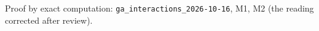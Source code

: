 Proof by exact computation: \texttt{ga\_interactions\_2026-10-16}, M1, M2 (the reading corrected after review).

